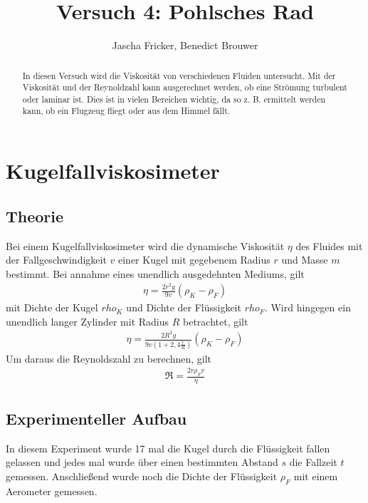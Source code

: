 \documentclass[11pt, a4paper]{article}
\title{Versuch 4: Pohlsches Rad}
\author{Jascha Fricker, Benedict Brouwer}
\begin{document}
    \maketitle

    

    \begin{abstract}
        In diesen Versuch wird die Viskosität von verschiedenen Fluiden untersucht. Mit der Viskosität
        und der Reynoldzahl kann ausgerechnet werden, ob eine Strömung turbulent oder laminar ist.
        Dies ist in vielen Bereichen wichtig, da so z. B. ermittelt werden kann, ob ein Flugzeug fliegt oder
        aus dem Himmel fällt.
    \end{abstract}

    \tableofcontents

    \newpage

    \section{Kugelfallviskosimeter}

    \subsection{Theorie}

    Bei einem Kugelfallviskosimeter wird die dynamische Viskosität $\eta$ des Fluides mit 
    der Fallgeschwindigkeit $v$ einer Kugel
    mit gegebenem Radius $r$ und Masse $m$ bestimmt.
    Bei annahme eines unendlich ausgedehnten Mediums, gilt
    \begin{align}
        \eta = \frac{2r^2g}{9v}(\rho_K - \rho_F)
    \end{align}
    mit Dichte der Kugel $rho_K$ und Dichte der Flüssigkeit $rho_F$.
    Wird hingegen ein unendlich langer Zylinder mit Radius $R$ betrachtet, gilt
    \begin{align}
        \eta = \frac{2R^2g}{9v(1+2,4\frac{r}{R})}(\rho_K - \rho_F)
        \label{eq:cylinder}
    \end{align}
    Um daraus die Reynoldszahl zu berechnen, gilt
    \begin{align}
        \Re = \frac{2r \rho_F v}{\eta}
    \end{align}

    \subsection{Experimenteller Aufbau}
    In diesem Experiment wurde 17 mal die Kugel durch die Flüssigkeit fallen gelassen und
    jedes mal wurde über einen bestimmten Abstand $s$ die Fallzeit $t$ gemessen.
    Anschließend wurde noch die Dichte der Flüssigkeit $\rho_F$ mit einem Aerometer gemessen.
    
\end{document}
